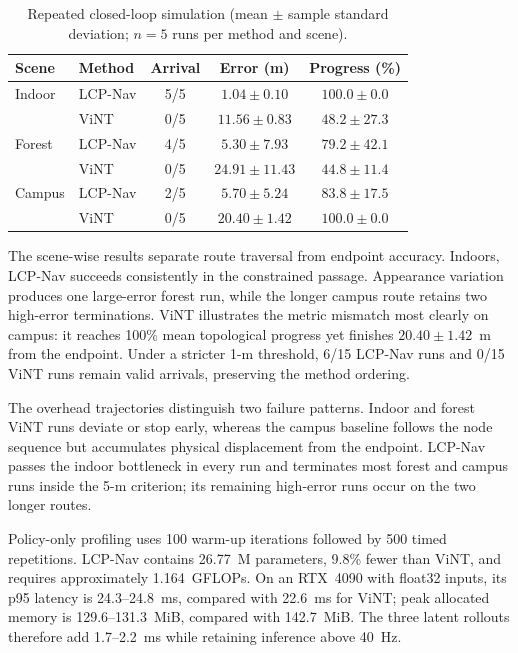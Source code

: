 \documentclass[conference]{IEEEtran}
\begin{document}
\begin{table}[t]
\centering
\caption{Repeated closed-loop simulation (mean $\pm$ sample standard deviation; $n=5$ runs per method and scene).}
\label{tab:closedloop}
\setlength{\tabcolsep}{3.2pt}
\footnotesize
\begin{tabular}{@{}llccc@{}}
\toprule
Scene & Method & Arrival & Error (m) & Progress (\%) \\
\midrule
Indoor & LCP-Nav & 5/5 & $1.04\pm0.10$ & $100.0\pm0.0$ \\
       & ViNT    & 0/5 & $11.56\pm0.83$ & $48.2\pm27.3$ \\
Forest & LCP-Nav & 4/5 & $5.30\pm7.93$ & $79.2\pm42.1$ \\
       & ViNT    & 0/5 & $24.91\pm11.43$ & $44.8\pm11.4$ \\
Campus & LCP-Nav & 2/5 & $5.70\pm5.24$ & $83.8\pm17.5$ \\
       & ViNT    & 0/5 & $20.40\pm1.42$ & $100.0\pm0.0$ \\
\bottomrule
\end{tabular}
\end{table}


The scene-wise results separate route traversal from endpoint accuracy. Indoors, LCP-Nav succeeds consistently in the constrained passage. Appearance variation produces one large-error forest run, while the longer campus route retains two high-error terminations. ViNT illustrates the metric mismatch most clearly on campus: it reaches 100\% mean topological progress yet finishes $20.40\pm1.42$~m from the endpoint. Under a stricter 1-m threshold, 6/15 LCP-Nav runs and 0/15 ViNT runs remain valid arrivals, preserving the method ordering.

The overhead trajectories distinguish two failure patterns. Indoor and forest ViNT runs deviate or stop early, whereas the campus baseline follows the node sequence but accumulates physical displacement from the endpoint. LCP-Nav passes the indoor bottleneck in every run and terminates most forest and campus runs inside the 5-m criterion; its remaining high-error runs occur on the two longer routes.


Policy-only profiling uses 100 warm-up iterations followed by 500 timed repetitions. LCP-Nav contains 26.77~M parameters, 9.8\% fewer than ViNT, and requires approximately 1.164~GFLOPs. On an RTX~4090 with float32 inputs, its p95 latency is 24.3--24.8~ms, compared with 22.6~ms for ViNT; peak allocated memory is 129.6--131.3~MiB, compared with 142.7~MiB. The three latent rollouts therefore add 1.7--2.2~ms while retaining inference above 40~Hz.
\end{document}
